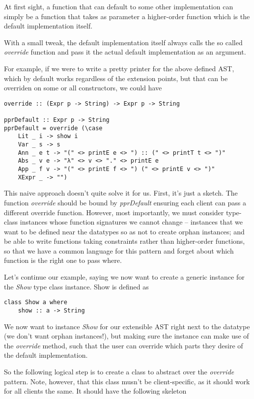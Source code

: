 \documentclass{article}
\begin{document}
At first sight, a function that can default to some other implementation can
simply be a function that takes as parameter a higher-order function which is
the default implementation itself.

With a small tweak, the default implementation itself always calls the
so called \emph{override} function and pass it the actual default implementation as
an argument.

For example, if we were to write a pretty printer for the above defined AST,
which by default works regardless of the extension points, but that can be
overriden on some or all constructors, we could have

\begin{lstlisting}
override :: (Expr p -> String) -> Expr p -> String

pprDefault :: Expr p -> String
pprDefault = override (\case 
    Lit _ i -> show i
    Var _ s -> s
    Ann _ e t -> "(" <> printE e <> ") :: (" <> printT t <> ")"
    Abs _ v e -> "λ" <> v <> "." <> printE e
    App _ f v -> "(" <> printE f <> ") (" <> printE v <> ")"
    XExpr _ -> "")
\end{lstlisting}

This naive approach doesn't quite solve it for us. First, it's just a sketch.
The function \emph{override} should be bound by \emph{pprDefault} ensuring each
client can pass a different override function. However, most importantly, we
must consider type-class instances whose function signatures we cannot change --
instances that we want to be defined near the datatypes so as not to create
orphan instances; and be able to write functions taking constraints rather than
higher-order functions, so that we have a common language for this pattern and
forget about which function is the right one to pass where.

Let's continue our example, saying we now want to create a generic instance for
the \emph{Show} type class instance. Show is defined as
\begin{lstlisting}
class Show a where
    show :: a -> String
\end{lstlisting}

We now want to instance \emph{Show} for our extensible AST right next to the
datatype (we don't want orphan instances!), but making sure the instance can
make use of the \emph{override} method, such that the user can override which
parts they desire of the default implementation.

So the following logical step is to create a class to abstract over the
\emph{override} pattern. Note, however, that this class musn't be
client-specific, as it should work for all clients the same. It should have the
following skeleton
\end{document}
